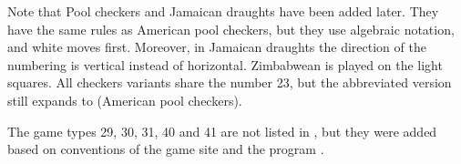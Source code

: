\documentclass[letterpaper,10pt,english]{sphinxmanual}
\begin{document}
\sphinxAtStartPar
\sphinxstylestrong{*)} Note that Pool checkers and Jamaican draughts have
been added later. They have the same rules as American pool checkers, but they use algebraic
notation, and white moves first. Moreover, in Jamaican draughts the direction of the
numbering is vertical instead of horizontal. Zimbabwean is played on the light squares.
All checkers variants share the number 23, but the abbreviated version \sphinxcode{\sphinxupquote{{[}GameType "23"{]}}}
still expands to \sphinxcode{\sphinxupquote{{[}GameType "23,B,8,8,N1,0"{]}}} (American pool checkers).

\sphinxAtStartPar
The game types 29, 30, 31, 40 and 41 are not listed in , but they were added
based on conventions of the game site  and the
program .
\end{document}

